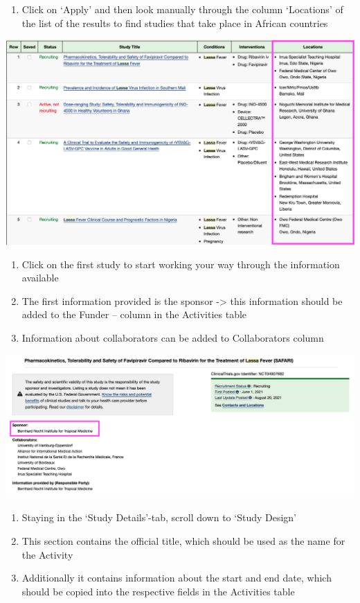 \documentclass[
]{book}
\providecommand{\tightlist}{%
  \setlength{\itemsep}{0pt}\setlength{\parskip}{0pt}}
\begin{document}
\begin{enumerate}
\def\labelenumi{\arabic{enumi}.}
\setcounter{enumi}{2}
\tightlist
\item
  Click on `Apply' and then look manually through the column `Locations' of the list of the results to find studies that take place in African countries
\end{enumerate}

\includegraphics{images/clinicaltrial3.png}

\begin{enumerate}
\def\labelenumi{\arabic{enumi}.}
\setcounter{enumi}{3}
\item
  Click on the first study to start working your way through the information available
\item
  The first information provided is the sponsor -\textgreater{} this information should be added to the Funder -- column in the Activities table
\item
  Information about collaborators can be added to Collaborators column
\end{enumerate}

\includegraphics{images/clinicaltrial4.png}

\begin{enumerate}
\def\labelenumi{\arabic{enumi}.}
\setcounter{enumi}{6}
\item
  Staying in the `Study Details'-tab, scroll down to `Study Design'
\item
  This section contains the official title, which should be used as the name for the Activity
\item
  Additionally it contains information about the start and end date, which should be copied into the respective fields in the Activities table
\end{enumerate}
\end{document}

